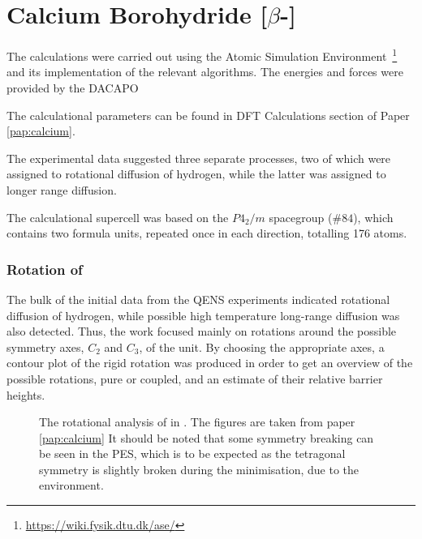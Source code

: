 \section{Calcium Borohydride [$\beta$-]}
\label{sec:borohydrides-calcium}

The calculations were carried out using the Atomic Simulation Environment~\cite{ase-2002}\footnote{\url{https://wiki.fysik.dtu.dk/ase/}} and its implementation of the relevant algorithms.
The energies and forces were provided by the DACAPO

The calculational parameters can be found in DFT Calculations section of Paper \ref{pap:calcium}.

The experimental data suggested three separate processes, two of which were assigned to rotational diffusion of hydrogen, while the latter was assigned to longer range diffusion.

The calculational supercell was based on the $P4_2/m$ spacegroup ($\#84$), which contains two formula units, repeated once in each direction, totalling 176 atoms.

\subsubsection{Rotation of }
The bulk of the initial data from the QENS experiments indicated rotational diffusion of hydrogen, while possible high temperature long-range diffusion was also detected.
Thus, the work focused mainly on rotations around the possible symmetry axes, $C_2$ and $C_3$, of the  unit.
By choosing the appropriate axes, a contour plot of the rigid rotation was produced in order to get an overview of the possible rotations, pure or coupled, and an estimate of their relative barrier heights.

\begin{figure}[h]
\begin{center}
    \parbox{0.85\linewidth}{
      \caption{The rotational analysis of  in .
      The figures are taken from paper \ref{pap:calcium}
It should be noted that some symmetry breaking can be seen in the PES, which is to be expected as the tetragonal symmetry is slightly broken during the minimisation, due to the environment.
      }
      \label{fig:ca-rotational}
    }
\end{center}
\end{figure}

